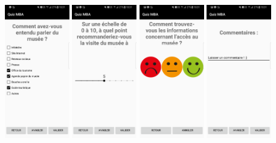 \documentclass[12]{report}
\begin{document}
  \begin{center}
    \includegraphics[width=2.8cm]{musee.png}
    \includegraphics[width=2.8cm]{recommandation.png}
    \includegraphics[width=2.8cm]{satisfaction.png}
    \includegraphics[width=2.8cm]{commentaire.png}
  \end{center}
\end{document}
